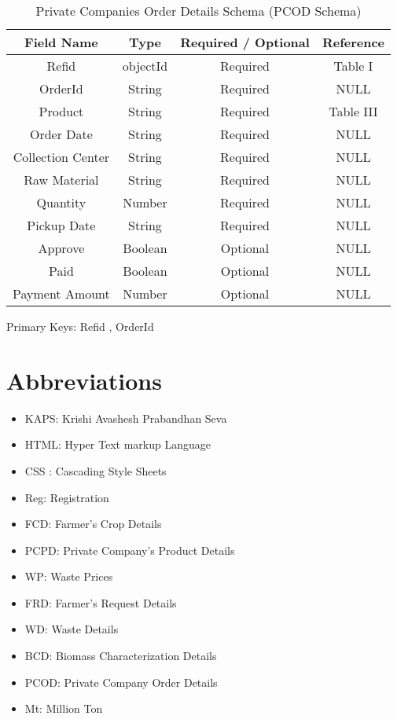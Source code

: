 \documentclass[conference]{IEEEtran}
\begin{document}
\begin{table}[htbp]
\caption{Private Companies Order Details Schema (PCOD Schema)}
\centering
\begin{tabular}{|c|c|c|c|} 
\hline
\textbf{Field Name} & \textbf{Type}& \textbf{Required / Optional } & \textbf{Reference} \\
\hline
Refid & objectId & Required & Table I \\
\hline
OrderId & String & Required & NULL \\
\hline
Product & String & Required & Table III \\
\hline
Order Date & String & Required & NULL\\
\hline
Collection Center & String & Required & NULL\\
\hline
Raw Material  & String & Required & NULL\\
\hline
Quantity & Number & Required & NULL\\
\hline
Pickup Date & String & Required & NULL\\
\hline
Approve & Boolean & Optional & NULL\\
\hline
Paid & Boolean & Optional & NULL\\
\hline
Payment Amount & Number & Optional & NULL\\
\hline
\end{tabular}
\label{table7}
\begin{center}
Primary Keys: Refid , OrderId
\end{center}
\end{table}
\raggedbottom
\hfill \break
\section{Abbreviations} \label{Abbreviations}
\begin{itemize}
    \item KAPS: Krishi Avashesh Prabandhan Seva
    \item HTML: Hyper Text markup Language
    \item CSS : Cascading Style Sheets
    \item Reg: Registration 
    \item FCD: Farmer's Crop Details 
    \item PCPD: Private Company's Product Details 
    \item WP: Waste Prices 
    \item FRD: Farmer's Request Details 
    \item WD: Waste Details 
    \item BCD: Biomass Characterization Details 
    \item PCOD: Private Company Order Details 
    \item Mt: Million Ton
\end{itemize}
\end{document}
